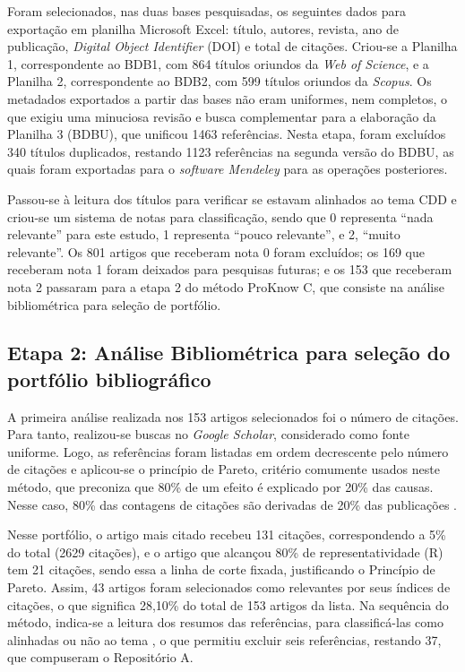 \documentclass[portuguese]{textolivre}
\begin{document}
Foram selecionados, nas duas bases pesquisadas, os seguintes dados para exportação em planilha Microsoft Excel: título, autores, revista, ano de publicação, \textit{Digital Object Identifier} (DOI) e total de citações. Criou-se a Planilha 1, correspondente ao BDB1, com 864 títulos oriundos da \textit{Web of Science}, e a Planilha 2, correspondente ao BDB2, com 599 títulos oriundos da \textit{Scopus}. Os metadados exportados a partir das bases não eram uniformes, nem completos, o que exigiu uma minuciosa revisão e busca complementar para a elaboração da Planilha 3 (BDBU), que unificou 1463 referências. Nesta etapa, foram excluídos 340 títulos duplicados, restando 1123 referências na segunda versão do BDBU, as quais foram exportadas para o \textit{software Mendeley} para as operações posteriores.

Passou-se à leitura dos títulos para verificar se estavam alinhados ao tema CDD e criou-se um sistema de notas para classificação, sendo que 0 representa “nada relevante” para este estudo, 1 representa “pouco relevante”, e 2, “muito relevante”. Os 801 artigos que receberam nota 0 foram excluídos; os 169 que receberam nota 1 foram deixados para pesquisas futuras; e os 153 que receberam nota 2 passaram para a etapa 2 do método ProKnow C, que consiste na análise bibliométrica para seleção de portfólio.

\subsection{Etapa 2: Análise Bibliométrica para seleção do portfólio bibliográfico}

A primeira análise realizada nos 153 artigos selecionados foi o número de citações. Para tanto, realizou-se buscas no \textit{Google Scholar}, considerado como fonte uniforme. Logo, as referências foram listadas em ordem decrescente pelo número de citações e aplicou-se o princípio de Pareto, critério comumente usados neste método, que preconiza que 80\% de um efeito é explicado por 20\% das causas. Nesse caso, 80\% das contagens de citações são derivadas de 20\% das publicações \cite{de_carvalho_bibliometrics_2020}.

Nesse portfólio, o artigo mais citado recebeu 131 citações, correspondendo a 5\% do total (2629 citações), e o artigo que alcançou 80\% de representatividade (R) tem 21 citações, sendo essa a linha de corte fixada, justificando o Princípio de Pareto. Assim, 43 artigos foram selecionados como relevantes por seus índices de citações, o que significa 28,10\% do total de 153 artigos da lista. Na sequência do método, indica-se a leitura dos resumos das referências, para classificá-las como alinhadas ou não ao tema \cite{linhares_capacidade_2019}, o que permitiu excluir seis referências, restando 37, que compuseram o Repositório A.
\end{document}

